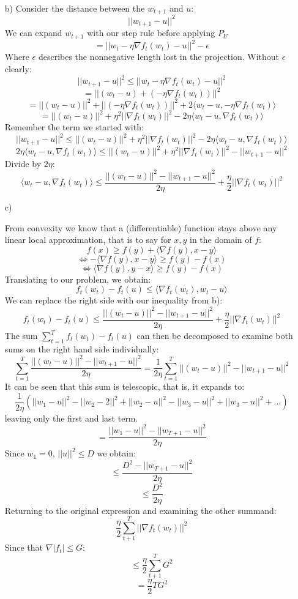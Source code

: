 \documentclass[10pt]{article}
\numberwithin{equation}{section}
\begin{document}
\begin{enumerate}
\item[b)] {
    Consider the distance between the $w_{t+1}$ and $u$:
  $$||w_{t+1} - u||^2$$
  We can expand $w_{t+1}$ with our step rule before applying $P_U$
  $$ = ||w_t - \eta \nabla f_t(w_t) - u||^2 - \epsilon$$
  Where $\epsilon$ describes the nonnegative length lost in the projection. Without $\epsilon$ clearly:
  $$||w_{t+1} - u||^2 \leq ||w_t - \eta \nabla f_t(w_t) - u||^2$$
  $$ = ||(w_t - u) + (-\eta \nabla f_t(w_t))||^2$$
  $$ = ||(w_t - u)||^2 + ||(-\eta \nabla f_t(w_t))||^2 + 2\langle w_t - u, -\eta \nabla f_t(w_t)\rangle $$
  $$ = ||(w_t - u)||^2 + \eta^2||\nabla f_t(w_t)||^2 - 2\eta\langle w_t - u, \nabla f_t(w_t)\rangle $$
  Remember the term we started with:
  $$ ||w_{t+1} - u||^2 \leq ||(w_t - u)||^2 + \eta^2||\nabla f_t(w_t)||^2 - 2\eta\langle w_t - u, \nabla f_t(w_t)\rangle $$
  $$  2\eta\langle w_t - u, \nabla f_t(w_t)\rangle \leq ||(w_t - u)||^2 + \eta^2||\nabla f_t(w_t)||^2 - ||w_{t+1} - u||^2$$
  Divide by $2\eta$:
  $$  \langle w_t - u, \nabla f_t(w_t)\rangle \leq \frac{||(w_t - u)||^2 - ||w_{t+1} - u||^2}{2\eta}+ \frac{\eta}{2}||\nabla f_t(w_t)||^2 $$
  }
\item[c)] {
    From convexity we know that a (differentiable) function stays above any linear local approximation, that is to say for $x,y$ in the domain of $f$:
    $$f(x) \geq f(y) + \langle \nabla f(y), x-y\rangle$$ 
    $$\Leftrightarrow -\langle \nabla f(y), x-y\rangle \geq f(y) - f(x)$$ 
    $$\Leftrightarrow \langle \nabla f(y), y-x\rangle \geq f(y) - f(x)$$ 
    Translating to our problem, we obtain:
    $$f_t(w_t) - f_t(u) \leq \langle \nabla f_t(w_t), w_t -u \rangle$$
    We can replace the right side with our inequality from b):
    $$f_t(w_t) - f_t(u) \leq  \frac{||(w_t - u)||^2 - ||w_{t+1} - u||^2}{2\eta}+ \frac{\eta}{2}||\nabla f_t(w_t)||^2 $$
    The sum $\sum_{t=1}^T f_t(w_t) - f_t(u)$ can then be decomposed to examine both sums on the right hand side individually:
    $$\sum_{t=1}^T \frac{||(w_t - u)||^2 - ||w_{t+1} - u||^2}{2\eta} = \frac{1}{2\eta}\sum_{t=1}^T ||(w_t - u)||^2 - ||w_{t+1} - u||^2$$
    It can be seen that this sum is telescopic, that is, it expands to:
    $$ \frac{1}{2\eta} ( ||w_1 - u||^2 - ||w_2 - 2||^2  + ||w_2 - u||^2 - ||w_3 - u||^2 + ||w_3 - u||^2 + \dots ) $$
    leaving only the first and last term.
    $$= \frac{||w_1- u ||^2 - ||w_{T+1} -u ||^2}{2\eta}$$
    Since $w_1 = 0$, $||u||^2 \leq D$ we obtain:
    $$\leq \frac{D^2 - ||w_{T+1} - u||^2}{2\eta}$$
    $$\leq \frac{D^2}{2\eta}$$
    Returning to the original expression and examining the other summand:
$$\frac{\eta}{2} \sum_{t+1}^T ||\nabla f_t(w_t)||^2$$
Since that $\nabla |f_t| \leq G$:
$$\leq \frac{\eta}{2} \sum_{t+1}^T G^2$$
$$= \frac{\eta}{2} T G^2$$

}
\end{enumerate}
\end{document}
